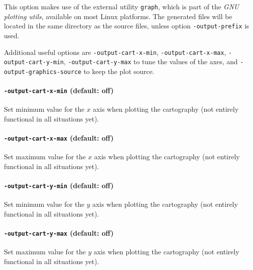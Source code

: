 \documentclass[a4paper,11pt]{report}
\newcommand{\styleOption}[1]{\textcolor{optioncolor}{\texttt{#1}}}
\begin{document}
This option makes use of the external utility \texttt{graph}, which is
part of the \emph{GNU plotting utils}, available on most Linux
platforms.
The generated files will be located in the same directory as the source files, unless option \styleOption{-output-prefix} is used.

Additional useful options are
\styleOption{-output-cart-x-min},
\styleOption{-output-cart-x-max},
\styleOption{-output-cart-y-min},
\styleOption{-output-cart-y-max}
to tune the values of the axes,
and \styleOption{-output-graphics-source} to keep the plot source.


\paragraph{\styleOption{-output-cart-x-min} (default: off)}
Set minimum value for the $x$ axis when plotting the cartography (not entirely functional in all situations yet).

\paragraph{\styleOption{-output-cart-x-max} (default: off)}
Set maximum value for the $x$ axis when plotting the cartography (not entirely functional in all situations yet).

\paragraph{\styleOption{-output-cart-y-min} (default: off)}
Set minimum value for the $y$ axis when plotting the cartography (not entirely functional in all situations yet).

\paragraph{\styleOption{-output-cart-y-max} (default: off)}
Set maximum value for the $y$ axis when plotting the cartography (not entirely functional in all situations yet).
\end{document}
